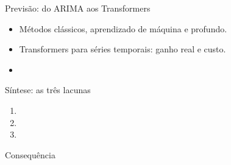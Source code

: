 \begin{frame}{Previsão: do ARIMA aos Transformers}
  \begin{itemize}
    \item Métodos clássicos, aprendizado de máquina e profundo.
    \item Transformers para séries temporais: ganho real e custo.
    \item {}
  \end{itemize}
\end{frame}

\begin{frame}{Síntese: as três lacunas}
  \begin{enumerate}
    \item {}
    \item {}
    \item {}
  \end{enumerate}
  \vfill
  \begin{block}{Consequência}
  \end{block}
\end{frame}
